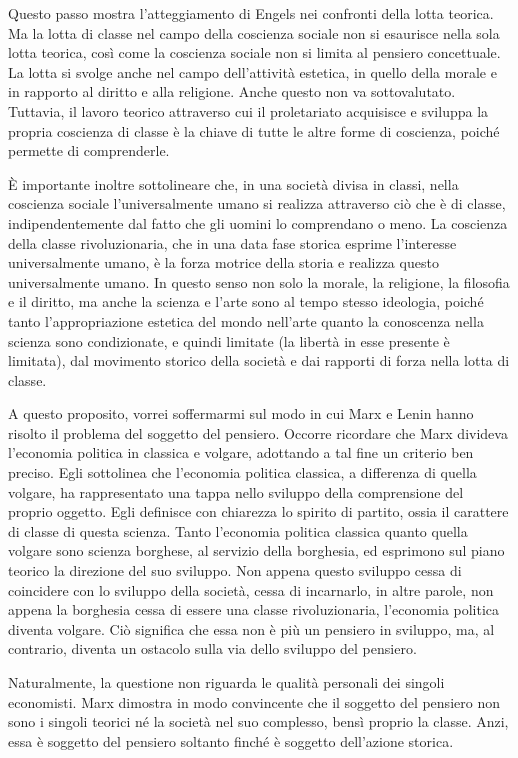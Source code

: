\documentclass[../main]{subfiles}
\begin{document}
Questo passo mostra l'atteggiamento di Engels nei confronti della lotta teorica. Ma la lotta di classe nel campo della coscienza sociale non si esaurisce nella sola lotta teorica, così come la coscienza sociale non si limita al pensiero concettuale. La lotta si svolge anche nel campo dell'attività estetica, in quello della morale e in rapporto al diritto e alla religione. Anche questo non va sottovalutato. Tuttavia, il lavoro teorico attraverso cui il proletariato acquisisce e sviluppa la propria coscienza di classe è la chiave di tutte le altre forme di coscienza, poiché permette di comprenderle.

È importante inoltre sottolineare che, in una società divisa in classi, nella coscienza sociale l'universalmente umano si realizza attraverso ciò che è di classe, indipendentemente dal fatto che gli uomini lo comprendano o meno. La coscienza della classe rivoluzionaria, che in una data fase storica esprime l'interesse universalmente umano, è la forza motrice della storia e realizza questo universalmente umano. In questo senso non solo la morale, la religione, la filosofia e il diritto, ma anche la scienza e l'arte sono al tempo stesso ideologia, poiché tanto l'appropriazione estetica del mondo nell'arte quanto la conoscenza nella scienza sono condizionate, e quindi limitate (la libertà in esse presente è limitata), dal movimento storico della società e dai rapporti di forza nella lotta di classe.

A questo proposito, vorrei soffermarmi sul modo in cui Marx e Lenin hanno risolto il problema del soggetto del pensiero. Occorre ricordare che Marx divideva l'economia politica in classica e volgare, adottando a tal fine un criterio ben preciso. Egli sottolinea che l'economia politica classica, a differenza di quella volgare, ha rappresentato una tappa nello sviluppo della comprensione del proprio oggetto. Egli definisce con chiarezza lo spirito di partito, ossia il carattere di classe di questa scienza. Tanto l'economia politica classica quanto quella volgare sono scienza borghese, al servizio della borghesia, ed esprimono sul piano teorico la direzione del suo sviluppo. Non appena questo sviluppo cessa di coincidere con lo sviluppo della società, cessa di incarnarlo, in altre parole, non appena la borghesia cessa di essere una classe rivoluzionaria, l'economia politica diventa volgare. Ciò significa che essa non è più un pensiero in sviluppo, ma, al contrario, diventa un ostacolo sulla via dello sviluppo del pensiero.

Naturalmente, la questione non riguarda le qualità personali dei singoli economisti. Marx dimostra in modo convincente che il soggetto del pensiero non sono i singoli teorici né la società nel suo complesso, bensì proprio la classe. Anzi, essa è soggetto del pensiero soltanto finché è soggetto dell'azione storica.
\end{document}

